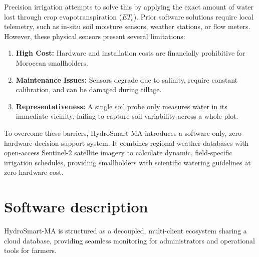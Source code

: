 \documentclass[3p,twocolumn]{elsarticle}
\begin{document}
Precision irrigation attempts to solve this by applying the exact amount of water lost through crop evapotranspiration ($ET_c$). Prior software solutions require local telemetry, such as in-situ soil moisture sensors, weather stations, or flow meters. However, these physical sensors present several limitations:
\begin{enumerate}
    \item \textbf{High Cost:} Hardware and installation costs are financially prohibitive for Moroccan smallholders.
    \item \textbf{Maintenance Issues:} Sensors degrade due to salinity, require constant calibration, and can be damaged during tillage.
    \item \textbf{Representativeness:} A single soil probe only measures water in its immediate vicinity, failing to capture soil variability across a whole plot.
\end{enumerate}

To overcome these barriers, HydroSmart-MA introduces a software-only, zero-hardware decision support system. It combines regional weather databases with open-access Sentinel-2 satellite imagery to calculate dynamic, field-specific irrigation schedules, providing smallholders with scientific watering guidelines at zero hardware cost.

\section{Software description}
HydroSmart-MA is structured as a decoupled, multi-client ecosystem sharing a cloud database, providing seamless monitoring for administrators and operational tools for farmers.
\end{document}
